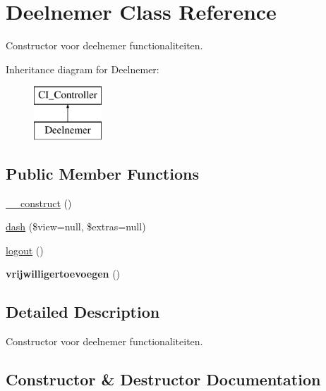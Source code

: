 \hypertarget{class_deelnemer}{}\section{Deelnemer Class Reference}
\label{class_deelnemer}


Constructor voor deelnemer functionaliteiten.  


Inheritance diagram for Deelnemer\+:\begin{figure}[H]
\begin{center}
\leavevmode
\includegraphics[height=2.000000cm]{class_deelnemer}
\end{center}
\end{figure}
\subsection*{Public Member Functions}
\begin{DoxyCompactItemize}
\item 
\mbox{\hyperlink{class_deelnemer_a944b1b4f4c37163240d73beba0466c57}{\+\_\+\+\_\+construct}} ()
\item 
\mbox{\hyperlink{class_deelnemer_aa5e6a397b1f669527face76891b1cdff}{dash}} (\$view=null, \$extras=null)
\item 
\mbox{\hyperlink{class_deelnemer_ae212b197beb54105709586f76b9644e6}{logout}} ()
\item 
\mbox{\label{class_deelnemer_af0aee7ff65e844a7fcc7359594c51fe4}} 
{\bfseries vrijwilligertoevoegen} ()
\end{DoxyCompactItemize}


\subsection{Detailed Description}
Constructor voor deelnemer functionaliteiten. 

\subsection{Constructor \& Destructor Documentation}
\mbox{\label{class_deelnemer_a944b1b4f4c37163240d73beba0466c57}} 
